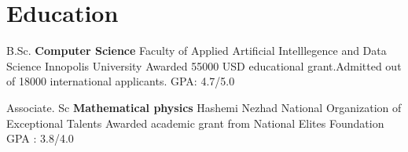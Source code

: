 \section{Education}
            {B.Sc. \textbf{Computer Science}}
            {Faculty of Applied Artificial Intelllegence and Data Science}
            {Innopolis University}
            {Awarded 55000 USD educational grant.Admitted out of 18000 international applicants.}
            {GPA: 4.7/5.0} 
  
    \vspace{10pt}
    
            {Associate. Sc \textbf{Mathematical physics}}
            {Hashemi Nezhad}
            {National Organization of Exceptional Talents}
            {Awarded academic grant from National Elites Foundation }
            {GPA : 3.8/4.0}